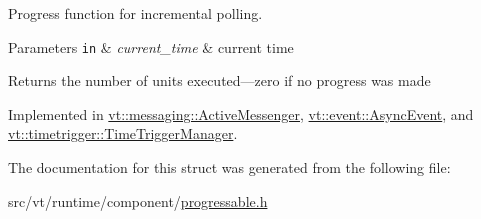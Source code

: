 Progress function for incremental polling. 


\begin{DoxyParams}[1]{Parameters}
\mbox{\tt in}  & {\em current\+\_\+time} & current time\\
\hline
\end{DoxyParams}
\begin{DoxyReturn}{Returns}
the number of units executed---zero if no progress was made 
\end{DoxyReturn}


Implemented in \hyperlink{structvt_1_1messaging_1_1_active_messenger_a59eadf26776b0adcf46d22d7bddedf4c}{vt\+::messaging\+::\+Active\+Messenger}, \hyperlink{structvt_1_1event_1_1_async_event_aa99cf6ece5deebbe4f43c9d21a78a2aa}{vt\+::event\+::\+Async\+Event}, and \hyperlink{structvt_1_1timetrigger_1_1_time_trigger_manager_a15cc796e1f07dbf32c04b3fb3f3ce06c}{vt\+::timetrigger\+::\+Time\+Trigger\+Manager}.



The documentation for this struct was generated from the following file\+:\begin{DoxyCompactItemize}
\item 
src/vt/runtime/component/\hyperlink{progressable_8h}{progressable.\+h}\end{DoxyCompactItemize}
